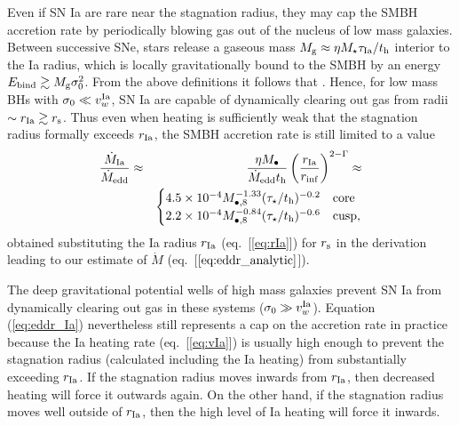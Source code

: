 \documentclass[usenatbib,fleqn]{mn2e}
\newcommand{\Mbheight}{M_{\bullet,8}}
\newcommand{\rIa}{r_{\rm Ia}}
\begin{document}
Even if SN Ia are rare near the stagnation radius, they may cap the
SMBH accretion rate by periodically blowing gas out of the nucleus of
low mass galaxies.  Between successive SNe, stars release a gaseous
mass $M_{\rm g} \approx \eta M_{\star}\tau_{\rm Ia}/t_{\rm h}$
interior to the Ia radius, which is locally gravitationally bound to
the SMBH by an energy $E_{\rm bind} \gtrsim M_{\rm g}\sigma_0^{2}$.
From the above definitions it follows that \be {} \lesssim {}.
\label{eq:blowout}
\ee
Hence, for low mass BHs with $\sigma_0 \ll v^{\rm Ia}_{w}$, SN Ia are capable of dynamically clearing out gas from radii $\sim r_{\rm Ia} \gtrsim r_{\rm s}$.  Thus even when heating is sufficiently weak that the stagnation radius formally exceeds $r_{\rm Ia}$, the SMBH accretion rate is still limited to a value
\begin{eqnarray}
\frac{\dot{M}_{\rm Ia}}{\dot{M}_{\rm edd}} &\approx& \frac{\eta M_{\bullet}}{\dot{M}_{\rm edd} t_{\rm h}}\left(\frac{r_{\rm Ia}}{r_{\rm inf}}\right)^{2-\Gamma} \approx \nonumber \\
 && \begin{cases}
    4.5 \times 10^{-4} M_{\bullet,8}^{-1.33}(\tau_{\star}/t_{\rm h})^{-0.2}
   & \text{core} \\
    2.2 \times 10^{-4} \Mbheight^{-0.84}(\tau_{\star}/t_{\rm h})^{-0.6}   & \text{cusp},
  \end{cases}
  \label{eq:eddr_Ia}
\end{eqnarray}
obtained substituting the Ia radius $r_{\rm Ia}$ (eq.~[\ref{eq:rIa}])
for $r_{\rm s}$ in the derivation leading to our estimate of $\dot{M}$
(eq.~[$\ref{eq:eddr_analytic}$]).  

The deep gravitational potential wells of high mass galaxies prevent
SN Ia from dynamically clearing out gas in these systems ($\sigma_0
\gg v^{\rm Ia}_{w}$).  Equation (\ref{eq:eddr_Ia}) nevertheless still
represents a cap on the accretion rate in practice because the Ia
heating rate (eq.~[\ref{eq:vIa}]) is usually high enough to prevent
the stagnation radius (calculated including the Ia heating) from
substantially exceeding $r_{\rm Ia}$. If the stagnation radius moves
inwards from $\rIa$, then decreased heating will force it outwards
again.  On the other hand, if the stagnation radius moves well outside
of $\rIa$, then the high level of Ia heating will force it inwards.
\end{document}
